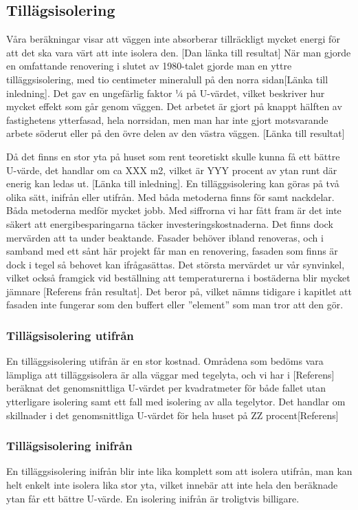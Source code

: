 \subsection{Tillägsisolering}
Våra beräkningar visar att väggen inte absorberar tillräckligt mycket energi för att det ska vara värt att inte isolera den.  [Dan länka till resultat]
När man gjorde en omfattande renovering i slutet av 1980-talet gjorde man en yttre tilläggsisolering, med tio centimeter mineralull på den norra sidan[Länka till inledning]. Det gav en ungefärlig faktor ¼ på U-värdet, vilket beskriver hur mycket effekt som går genom väggen. Det arbetet är gjort på knappt hälften av fastighetens ytterfasad, hela norrsidan, men man har inte gjort motsvarande arbete söderut eller på den övre delen av den västra väggen. [Länka till resultat]

Då det finns en stor yta på huset som rent teoretiskt skulle kunna få ett bättre U-värde, det handlar om ca XXX m2, vilket är YYY procent av ytan runt där enerig kan ledas ut. [Länka till inledning].
En tilläggsisolering kan göras på två olika sätt, inifrån eller utifrån. Med båda metoderna finns för samt nackdelar. Båda metoderna medför mycket jobb. Med siffrorna vi har fått fram är det inte säkert att energibesparingarna täcker investeringskostnaderna. Det finns dock mervärden att ta under beaktande. Fasader behöver ibland renoveras, och i samband med ett sånt här projekt får man en renovering, fasaden som finns är dock i tegel så behovet kan ifrågasättas. Det största mervärdet ur vår synvinkel, vilket också framgick vid beställning att temperaturerna i bostäderna blir mycket jämnare [Referens från resultat]. Det beror på, vilket nämns tidigare i kapitlet att fasaden inte fungerar som den buffert eller ”element” som man tror att den gör.
\subsubsection{Tillägsisolering utifrån}
En tilläggsisolering utifrån är en stor kostnad. Områdena som bedöms vara lämpliga att tilläggsisolera är alla väggar med tegelyta, och vi har i [Referens] beräknat det genomsnittliga U-värdet per kvadratmeter för både fallet utan ytterligare isolering samt ett fall med isolering av alla tegelytor. Det handlar om skillnader i det genomsnittliga U-värdet för hela huset på ZZ procent[Referens]
\subsubsection{Tillägsisolering inifrån}
En tilläggsisolering inifrån blir inte lika komplett som att isolera utifrån, man kan helt enkelt inte isolera lika stor yta, vilket innebär att inte hela den beräknade ytan får ett bättre U-värde. En isolering inifrån är troligtvis billigare.
